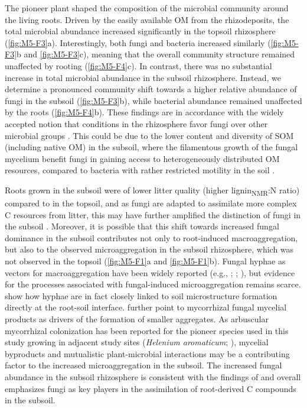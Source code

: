 The pioneer plant shaped the composition of the microbial community around the living roots. Driven by the easily available OM from the rhizodeposits, the total microbial abundance increased significantly in the topsoil rhizosphere (\ref{fig:M5-F3}a). Interestingly, both fungi and bacteria increased similarly (\ref{fig:M5-F3}b and \ref{fig:M5-F3}c), meaning that the overall community structure remained unaffected by rooting (\ref{fig:M5-F4}c). In contrast, there was no substantial increase in total microbial abundance in the subsoil rhizosphere. Instead, we determine a pronounced community shift towards a higher relative abundance of fungi in the subsoil (\ref{fig:M5-F3}b), while bacterial abundance remained unaffected by the roots (\ref{fig:M5-F4}b). These findings are in accordance with the widely accepted notion that conditions in the rhizosphere favor fungi over other microbial groups \citep{Butler2003, Brant2006, Denef2009}. This could be due to the lower content and diversity of SOM (including native OM) in the subsoil, where the filamentous growth of the fungal mycelium benefit fungi in gaining access to heterogeneously distributed OM resources, compared to bacteria with rather restricted motility in the soil \citep{DeBoer2005}.

Roots grown in the subsoil were of lower litter quality (higher lignin\textsubscript{NMR}:N ratio) compared to in the topsoil, and as fungi are adapted to assimilate more complex C resources from litter, this may have further amplified the distinction of fungi in the subsoil \citep{Poll2006}. Moreover, it is possible that this shift towards increased fungal dominance in the subsoil contributes not only to root-induced macroaggregation, but also to the observed microaggregation in the subsoil rhizosphere, which was not observed in the topsoil (\ref{fig:M5-F1}a and \ref{fig:M5-F1}b). Fungal hyphae as vectors for macroaggregation have been widely reported (e.g., \citep{Bossuyt2001}; \citep{Lehmann2020}; \citep{Bucka2021}), but evidence for the processes associated with fungal-induced microaggregation remains scarce. \citet{Vidal2018} show how hyphae are in fact closely linked to soil microstructure formation directly at the root-soil interface. \citet{Rillig2006} further point to mycorrhizal fungal mycelial products as drivers of the formation of smaller aggregates. As arbuscular mycorrhizal colonization has been reported for the pioneer species used in this study growing in adjacent study sites (\textit{Helenium aromaticum}; \citep{Dhillion1995}), mycelial byproducts and mutualistic plant-microbial interactions may be a contributing factor to the increased microaggregation in the subsoil. The increased fungal abundance in the subsoil rhizosphere is consistent with the findings of \citet{Baumert2021} and overall emphasizes fungi as key players in the assimilation of root-derived C compounds in the subsoil.

